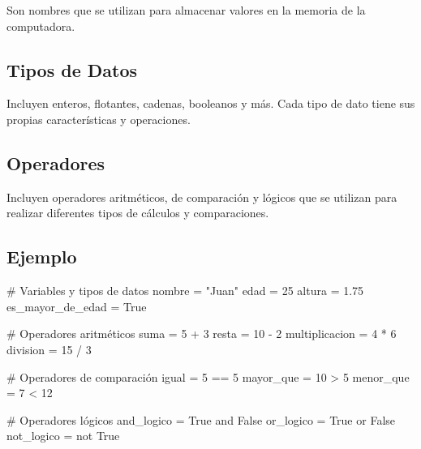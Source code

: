 \documentclass[
  a4paper,
  onepage,
  openany]{scrreprt}
\newenvironment{Shaded}{\begin{snugshade}}{\end{snugshade}}
\newcommand{\CommentTok}[1]{\textcolor[rgb]{0.37,0.37,0.37}{#1}}
\newcommand{\DecValTok}[1]{\textcolor[rgb]{0.68,0.00,0.00}{#1}}
\newcommand{\FloatTok}[1]{\textcolor[rgb]{0.68,0.00,0.00}{#1}}
\newcommand{\KeywordTok}[1]{\textcolor[rgb]{0.00,0.23,0.31}{#1}}
\newcommand{\NormalTok}[1]{\textcolor[rgb]{0.00,0.23,0.31}{#1}}
\newcommand{\OperatorTok}[1]{\textcolor[rgb]{0.37,0.37,0.37}{#1}}
\newcommand{\StringTok}[1]{\textcolor[rgb]{0.13,0.47,0.30}{#1}}
\newcommand{\VariableTok}[1]{\textcolor[rgb]{0.07,0.07,0.07}{#1}}
\begin{document}
Son nombres que se utilizan para almacenar valores en la memoria de la
computadora.

\hypertarget{tipos-de-datos-1}{%
\subsection{Tipos de Datos}\label{tipos-de-datos-1}}

Incluyen enteros, flotantes, cadenas, booleanos y más. Cada tipo de dato
tiene sus propias características y operaciones.

\hypertarget{operadores-1}{%
\subsection{Operadores}\label{operadores-1}}

Incluyen operadores aritméticos, de comparación y lógicos que se
utilizan para realizar diferentes tipos de cálculos y comparaciones.

\hypertarget{ejemplo-5}{%
\subsection{Ejemplo}\label{ejemplo-5}}

\begin{Shaded}
\begin{Highlighting}[]

\CommentTok{\# Variables y tipos de datos}
\NormalTok{nombre }\OperatorTok{=} \StringTok{"Juan"}
\NormalTok{edad }\OperatorTok{=} \DecValTok{25}
\NormalTok{altura }\OperatorTok{=} \FloatTok{1.75}
\NormalTok{es\_mayor\_de\_edad }\OperatorTok{=} \VariableTok{True}

\CommentTok{\# Operadores aritméticos}
\NormalTok{suma }\OperatorTok{=} \DecValTok{5} \OperatorTok{+} \DecValTok{3}
\NormalTok{resta }\OperatorTok{=} \DecValTok{10} \OperatorTok{{-}} \DecValTok{2}
\NormalTok{multiplicacion }\OperatorTok{=} \DecValTok{4} \OperatorTok{*} \DecValTok{6}
\NormalTok{division }\OperatorTok{=} \DecValTok{15} \OperatorTok{/} \DecValTok{3}

\CommentTok{\# Operadores de comparación}
\NormalTok{igual }\OperatorTok{=} \DecValTok{5} \OperatorTok{==} \DecValTok{5}
\NormalTok{mayor\_que }\OperatorTok{=} \DecValTok{10} \OperatorTok{\textgreater{}} \DecValTok{5}
\NormalTok{menor\_que }\OperatorTok{=} \DecValTok{7} \OperatorTok{\textless{}} \DecValTok{12}

\CommentTok{\# Operadores lógicos}
\NormalTok{and\_logico }\OperatorTok{=} \VariableTok{True} \KeywordTok{and} \VariableTok{False}
\NormalTok{or\_logico }\OperatorTok{=} \VariableTok{True} \KeywordTok{or} \VariableTok{False}
\NormalTok{not\_logico }\OperatorTok{=} \KeywordTok{not} \VariableTok{True}
\end{Highlighting}
\end{Shaded}
\end{document}

